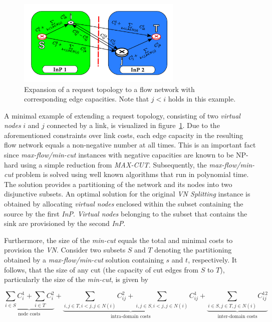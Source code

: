 \documentclass[prodmode,acmtomccap]{acmlarge}
\begin{document}
\begin{figure}[htb]
	\centering
	\includegraphics[width=0.7\textwidth]{maxflow}
	\caption{Expansion of a request topology to a flow network with corresponding edge capacities. Note that $j < i$ holds in this example.}
	\label{fig5}
\end{figure}

A minimal example of extending a request topology, consisting of two \emph{virtual nodes} $i$ and $j$ connected by a link, is visualized in figure~\ref{fig5}.
Due to the aforementioned constraints over link costs, each edge capacity in the resulting flow network equals a non-negative number at all times. This is an important fact since
\emph{max-flow/min-cut} instances with negative capacities are known to be NP-hard using a simple reduction from \emph{MAX-CUT}.
Subsequently, the \emph{max-flow/min-cut} problem is solved using well known algorithms that run in polynomial time. The solution provides a partitioning of the network and its nodes
into two disjunctive subsets. An optimal solution for the original \emph{VN Splitting} instance is obtained by allocating \emph{virtual nodes} enclosed within the subset containing the source by the first \emph{InP}.
\emph{Virtual nodes} belonging to the subset that contains the sink are provisioned by the second \emph{InP}.

Furthermore, the size of the \emph{min-cut} equals the total and minimal
costs to provision the \emph{VN}. Consider two subsets $S$ and $T$ denoting the partitioning obtained by a \emph{max-flow/min-cut} solution containing $s$ and $t$, respectively.
It follows, that the size of any cut (the capacity of cut edges from $S$ to $T$), particularly the size of the \emph{min-cut}, is given by

$$
	\underbrace{\sum\limits_{i \in S} C_i^1 + \sum\limits_{i \in T} C_i^2}_{\text{node costs}} + 
	\underbrace{\sum\limits_{i,j \in T, i < j, j \in N(i)} C_{ij}^2 + \sum\limits_{i,j \in S, i < j, j \in N(i)} C_{ij}^1}_{\text{intra-domain costs}}
	+\underbrace{\sum\limits_{i \in S, j \in T, j \in N(i)} C_{ij}^{12}}_{\text{inter-domain costs}}
$$
\end{document}
